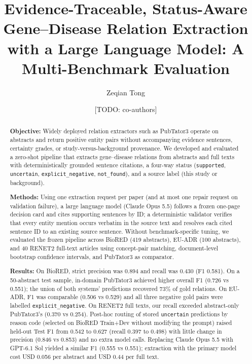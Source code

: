 \documentclass[preprint,10pt,letterpaper]{elsarticle}
\newcommand{\st}[1]{\texttt{#1}}             %
\newcommand{\todo}[1]{\textcolor{stneg}{[TODO: #1]}}
\begin{document}
\begin{frontmatter}

\title{Evidence-Traceable, Status-Aware Gene--Disease Relation Extraction with a Large Language Model: A Multi-Benchmark Evaluation}

\author[a]{Zeqian Tong}
\author[b]{\todo{co-authors}}
\affiliation[a]{organization={\todo{affiliation}}}
\affiliation[b]{organization={\todo{affiliation}}}

\begin{abstract}
\setlength{\parindent}{0pt}\setlength{\parskip}{6pt}%
\textbf{Objective:} Widely deployed relation extractors such as PubTator3 operate on abstracts and return positive entity pairs without accompanying evidence sentences, certainty grades, or study-versus-background provenance. We developed and evaluated a zero-shot pipeline that extracts gene--disease relations from abstracts and full texts with deterministically grounded sentence citations, a four-way status (\st{supported}, \st{uncertain}, \st{explicit\_negative}, \st{not\_found}), and a source label (this study or background).

\textbf{Methods:} Using one extraction request per paper (and at most one repair request on validation failure), a large language model (Claude Opus 5.5) follows a frozen one-page decision card and cites supporting sentences by ID; a deterministic validator verifies that every entity mention occurs verbatim in the source text and resolves each cited sentence ID to an existing source sentence. Without benchmark-specific tuning, we evaluated the frozen pipeline across BioRED (419 abstracts), EU-ADR (100 abstracts), and 40 RENET2 full-text articles using concept-pair matching, document-level bootstrap confidence intervals, and PubTator3 as comparator.

\textbf{Results:} On BioRED, strict precision was 0.894 and recall was 0.430 (F1 0.581). On a 50-abstract test sample, in-domain PubTator3 achieved higher overall F1 (0.726 vs 0.551); the union of both systems' predictions recovered 73\% of gold relations. On EU-ADR, F1 was comparable (0.506 vs 0.529) and all three negative gold pairs were labelled \st{explicit\_negative}. On RENET2 full texts, our recall exceeded abstract-only PubTator3's (0.370 vs 0.254). Post-hoc routing of stored \st{uncertain} predictions by reason code (selected on BioRED Train+Dev without modifying the prompt) raised held-out Test F1 from 0.542 to 0.627 (recall 0.397 to 0.498) with little change in precision (0.846 vs 0.853) and no extra model calls. Replacing Claude Opus 5.5 with GPT-6.1 Sol yielded a similar F1 (0.555 vs 0.551); extraction with the primary model cost USD 0.056 per abstract and USD 0.44 per full text.


\end{abstract}
\end{frontmatter}
\end{document}
